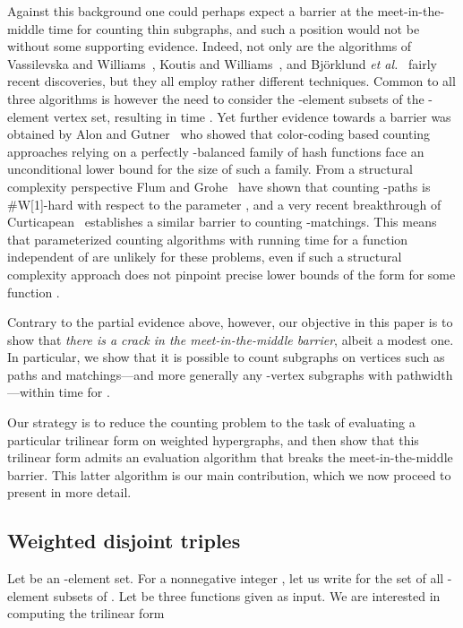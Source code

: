 \documentclass{amsart}
\begin{document}
Against this background one could perhaps expect a barrier 
at the meet-in-the-middle time  for counting
thin subgraphs, and such a position would not be without some supporting 
evidence. Indeed, not only are the algorithms of Vassilevska and 
Williams~\cite{VW09}, Koutis and Williams~\cite{KW09}, and Bj\"orklund \emph{et al.}~\cite{BHKK09} fairly recent discoveries, but they all employ 
rather different techniques. Common to all three algorithms is however 
the need to consider the -element subsets of the -element vertex set, 
resulting in time . Yet further evidence towards a barrier 
was obtained by Alon and Gutner~\cite{AG09} who showed that 
color-coding based counting approaches relying on 
a perfectly -balanced family of hash functions face 
an unconditional  lower bound for the size 
of such a family. From a structural complexity perspective 
Flum and Grohe~\cite{FG04} have shown that counting -paths is \#W[1]-hard 
with respect to the parameter , and a very recent breakthrough of 
Curticapean~\cite{C13} establishes a similar barrier to counting -matchings.
This means that parameterized counting algorithms with running time  
for a function  independent of  are unlikely for these problems,
even if such a structural complexity approach does not pinpoint precise
lower bounds of the form  for some function . 

Contrary to the partial evidence above, however, our objective
in this paper is to show that 
{\em there is a crack in the meet-in-the-middle barrier}, 
albeit a modest one. In particular, we show that it is possible 
to count subgraphs on  vertices such as paths and matchings---and more 
generally any -vertex subgraphs with pathwidth ---within 
time  for .

Our strategy is to reduce the counting problem to the task of 
evaluating a particular trilinear form on weighted hypergraphs, and 
then show that this trilinear form admits an evaluation algorithm that breaks 
the meet-in-the-middle barrier. This latter algorithm is our main contribution,
which we now proceed to present in more detail.

\subsection{Weighted disjoint triples}

Let  be an -element set. For a nonnegative integer , let us write  for the set of all -element subsets of . 
Let  be three functions given 
as input. We are interested in computing the trilinear form
\end{document}
